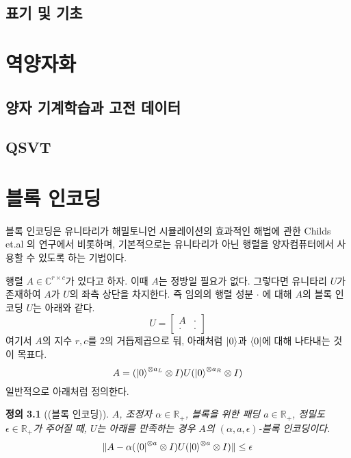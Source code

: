 \documentclass[hidelinks,article,a4paper,chapter,twocolumn]{oblivoir}
\newtheorem{defn}{정의}[chapter]
\let\oldbibliography
\renewcommand{}[1]{{%
\let\chapter\section
\oldbibliography{#1}}}
\begin{document}
\section{표기 및 기초}
\chapter{역양자화}
\section{양자 기계학습과 고전 데이터}
\section{QSVT}
\chapter{블록 인코딩}
블록 인코딩은 유니타리가 해밀토니언 시뮬레이션의 효과적인 해법에 관한
Childs et.al \cite{Childs2017}의 연구에서 비롯하며, 기본적으로는 유니타리가
아닌 행렬을 양자컴퓨터에서 사용할 수 있도록 하는 기법이다. 

행렬 $A\in\mathbb{C}^{r\times c}$가 있다고 하자. 이때 $A$는 정방일 필요가
없다. 그렇다면 유니타리 $U$가 존재하여 $A$가 $U$의 좌측 상단을 차지한다. 즉
임의의 행렬 성분 $\cdot$ 에 대해 $A$의 블록 인코딩 $U$는 아래와 같다.
\begin{equation}
  U = \begin{bmatrix}A&\cdot\\\cdot&\cdot\end{bmatrix}
\end{equation}
여기서 $A$의 지수 $r,c$를 $2$의 거듭제곱으로 둬, 아래처럼 $\ket0$과 $\bra0$에
대해 나타내는 것이 목표다. 
\begin{equation}
  A = (\ket0^{\otimes a_L}\otimes I)U(\ket0^{\otimes a_R}\otimes I)
\end{equation}
일반적으로 \cite{Gilyen2019, Rall2020} 아래처럼 정의한다.
\begin{defn}[(블록 인코딩)]
  $A$, 조정자 $\alpha\in\mathbb{R}_{+}$, 블록을 위한 패딩 $a\in\mathbb{R}_+$,
  정밀도 $\epsilon\in\mathbb{R}_+$가 주어질 때, $U$는 아래를 만족하는 경우
  $A$의 $(\alpha,a,\epsilon)$-블록 인코딩이다.
  \begin{equation}
    \|A-\alpha(\bra0^{\otimes a}\otimes I)U(\ket0^{\otimes a}\otimes I)\|\leq
    \epsilon
  \end{equation}
\end{defn}


\end{document}
